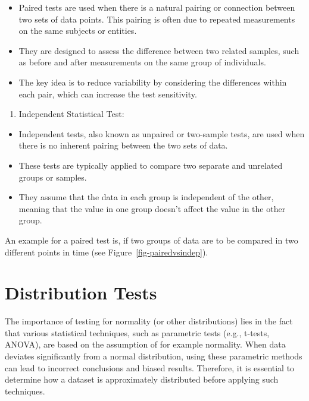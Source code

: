 \documentclass[
  a4paper,
]{scrbook}
\providecommand{\tightlist}{%
  \setlength{\itemsep}{0pt}\setlength{\parskip}{0pt}}\usepackage{longtable,booktabs,array}
\begin{document}
\begin{itemize}
\tightlist
\item
  Paired tests are used when there is a natural pairing or connection
  between two sets of data points. This pairing is often due to repeated
  measurements on the same subjects or entities.
\item
  They are designed to assess the difference between two related
  samples, such as before and after measurements on the same group of
  individuals.
\item
  The key idea is to reduce variability by considering the differences
  within each pair, which can increase the test sensitivity.
\end{itemize}

\begin{enumerate}
\def\labelenumi{\arabic{enumi}.}
\setcounter{enumi}{1}
\tightlist
\item
  Independent Statistical Test:
\end{enumerate}

\begin{itemize}
\tightlist
\item
  Independent tests, also known as unpaired or two-sample tests, are
  used when there is no inherent pairing between the two sets of data.
\item
  These tests are typically applied to compare two separate and
  unrelated groups or samples.
\item
  They assume that the data in each group is independent of the other,
  meaning that the value in one group doesn't affect the value in the
  other group.
\end{itemize}

An example for a paired test is, if two groups of data are to be
compared in two different points in time (see
Figure~\ref{fig-pairedvsindep}).

\newpage{}

\section{Distribution Tests}\label{distribution-tests}

The importance of testing for normality (or other distributions) lies in
the fact that various statistical techniques, such as parametric tests
(e.g., t-tests, ANOVA), are based on the assumption of for example
normality. When data deviates significantly from a normal distribution,
using these parametric methods can lead to incorrect conclusions and
biased results. Therefore, it is essential to determine how a dataset is
approximately distributed before applying such techniques.
\end{document}
